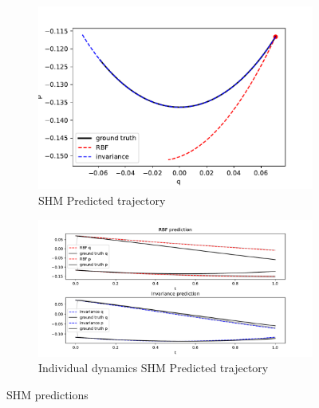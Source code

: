 \documentclass{statsmsc}
\begin{document}
\begin{figure}[H]
     \centering
     \begin{subfigure}[b]{\linewidth}
        \centering
        \includegraphics[width=\linewidth]{../codes/figures/shm_predicted_trajectory.pdf}
        \caption{SHM Predicted trajectory}
        \label{fig:shm_prediction_combined}
     \end{subfigure}
     \hfill
     \begin{subfigure}[b]{\linewidth}
         \centering
         \includegraphics[width=\linewidth]{../codes/figures/shm_predicted_trajectory_seperate.pdf}
         \caption{Individual dynamics SHM Predicted trajectory}
         \label{fig:shm_prediction_seperate}
     \end{subfigure}
        \caption{SHM predictions}
        \label{fig:shm_prediction}
\end{figure}
\end{document}
